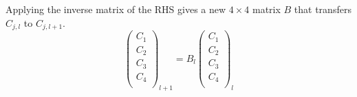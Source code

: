 \documentclass[%
 reprint,
 amsmath,
 amssymb,
 aps,
 prl,
 lengthcheck,%
]{revtex4-1}
\begin{document}
\begin{widetext}

\end{widetext}

Applying the inverse matrix of the RHS gives a new $4 \times 4$ matrix $B$ that
transfers $C_{j,l}$ to $C_{j,l+1}$.  
\begin{equation}
  \left(
  \begin{matrix}
    C_{1} \\
    C_{2} \\
    C_{3} \\
    C_{4} \\
  \end{matrix}
  \right)_{\!\!l+1}\!\!\!\!\!\!
  = B_l
  \left(
  \begin{matrix}
    C_{1} \\
    C_{2} \\
    C_{3} \\
    C_{4} \\
  \end{matrix}
  \right)_{\!\!l}
\end{equation}
\end{document}
